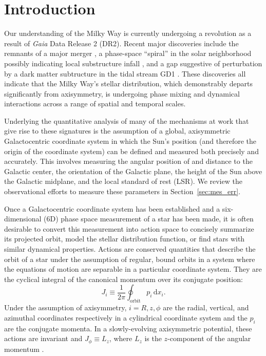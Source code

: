 \documentclass[twocolumn]{aastex62}
\newcommand{\beq}{\begin{equation}}
\newcommand{\eeq}{\end{equation}}
\begin{document}

\section{Introduction} \label{sec:intro}
Our understanding of the Milky Way is currently undergoing a revolution as a
result of \textit{Gaia} Data Release 2 (DR2).  Recent major discoveries
include the remnants of a major merger \citep{2018ApJ...860L..11K,
2018Natur.563...85H, 2018arXiv180704290L, 2019MNRAS.482.3426M}, a phase-space
``spiral'' in the solar neighborhood \citep{2018Natur.561..360A} possibly
indicating local substructure infall \citep{2018MNRAS.481.1501B,
2018arXiv180800451L}, and a gap
suggestive of perturbation by a dark matter subtructure in the tidal stream
GD1 \citep{2018ApJ...863L..20P, 2018arXiv181103631B}. These discoveries all
indicate that the Milky Way's stellar distribution, which demonstrably departs
significantly from axisymmetry, is undergoing phase mixing and dynamical
interactions across a range of spatial and temporal scales.

Underlying the quantitative analysis of many of the mechanisms at work that
give rise to these signatures is the assumption of a global, axisymmetric
Galactocentric coordinate system \citep{2008gady.book.....B} in which the
Sun's position (and therefore the origin of the coordinate system) can be
defined and measured both precisely and accurately. This involves measuring
the angular position of and distance to the Galactic center, the orientation
of the Galactic plane, the height of the Sun above the Galactic midplane, and
the local standard of rest (LSR). We review the observational efforts to
measure these parameters in Section~\ref{sec:mes_err}.

Once a Galactocentric coordinate system has been established and a
six-dimensional (6D) phase space measurement of a star has been made, it is
often desirable to convert this measurement into action space to concisely
summarize its projected orbit, model the stellar distribution function, or
find stars with similar dynamical properties. Actions are conserved quantities
that describe the orbit of a star under the assumption of regular, bound
orbits in a system where the equations of motion are separable in a particular
coordinate system. They are the cyclical integral of the canonical momentum
over its conjugate position:
\beq\label{eq:actions}
J_i \equiv
\frac{1}{2\pi} \oint_{\text{orbit}}p_i\,\text{d}x_i\text{.}
\eeq
Under the assumption of axisymmetry, $i=R,z,\phi$ are the radial, vertical,
and azimuthal coordinates respectively in a cylindrical coordinate system and
the $p_i$ are the conjugate momenta. In a slowly-evolving axisymmetric
potential, these actions are invariant and $J_{\phi} \equiv L_z$, where $L_z$
is the $z$-component of the angular momentum
\citep{2008gady.book.....B,2014RvMP...86....1S}.
\end{document}
